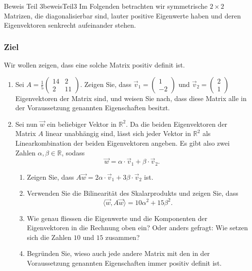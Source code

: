 \begin{LA}
	{Beweis Teil 3}{beweisTeil3}
	\noindent Im Folgenden betrachten wir symmetrische $2 \times 2$ Matrizen, die diagonalisierbar sind, lauter positive Eigenwerte haben und deren Eigenvektoren senkrecht aufeinander stehen.

	\subsubsection*{Ziel}
	Wir wollen zeigen, dass eine solche Matrix positiv definit ist.

	\begin{enumerate}
		\item Sei \(A = \frac{1}{5} \begin{pmatrix} 14 & 2 \\ 2 & 11 \end{pmatrix}\). Zeigen Sie, dass \(\vec{v}_1 = \begin{pmatrix} 1 \\ -2 \end{pmatrix}\) und \(\vec{v}_2 = \begin{pmatrix} 2 \\ 1 \end{pmatrix}\) Eigenvektoren der Matrix sind, und weisen Sie nach, dass diese Matrix alle in der Voraussetzung genannten Eigenschaften besitzt.

		\item Sei nun \(\vec{w}\) ein beliebiger Vektor in \(\mathbb{R}^2\). Da die beiden Eigenvektoren der Matrix \(A\) linear unabhängig sind, lässt sich jeder Vektor in \(\mathbb{R}^2\) als Linearkombination der beiden Eigenvektoren angeben. Es gibt also zwei Zahlen \(\alpha, \beta \in \mathbb{R}\), sodass
		      \[
			      \vec{w} = \alpha \cdot \vec{v}_1 + \beta \cdot \vec{v}_2.
		      \]

		      \begin{enumerate}
			      \item Zeigen Sie, dass \(A \vec{w} = 2\alpha \cdot \vec{v}_1 + 3\beta \cdot \vec{v}_2\) ist.

			      \item Verwenden Sie die Bilinearität des Skalarprodukts und zeigen Sie, dass
			            \[
				            \langle \vec{w}, A \vec{w} \rangle = 10\alpha^2 + 15\beta^2.
			            \]

			      \item Wie genau fliessen die Eigenwerte und die Komponenten der Eigenvektoren in die Rechnung oben ein? Oder anders gefragt: Wie setzen sich die Zahlen \(10\) und \(15\) zusammen?

			      \item Begründen Sie, wieso auch jede andere Matrix mit den in der Voraussetzung genannten Eigenschaften immer positiv definit ist.
		      \end{enumerate}
	\end{enumerate}
\end{LA}

